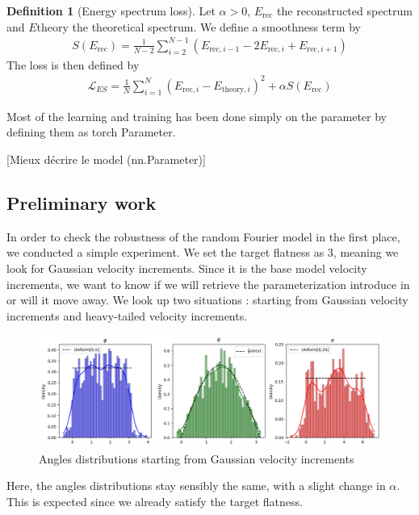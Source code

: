 \documentclass[a4paper,12pt]{article}
\theoremstyle{definition}
\newtheorem{definition}{Definition}
\begin{document}
\begin{definition}[Energy spectrum loss]
    Let $\alpha>0$, $E_\text{rec}$ the reconstructed spectrum and $E\text{theory}$ the theoretical spectrum.
    We define a smoothness term by 
    \begin{align}
        S(E_\text{rec}) = \frac{1}{N-2}\sum_{i=2}^{N-1}\left(E_{\text{rec},i-1} -2E_{\text{rec},i} + E_{\text{rec},i+1}   \right)
    \end{align}
    The loss is then defined by 
    \begin{align}
        \mathcal{L}_{ES} = \frac{1}{N} \sum_{i=1}^{N} (E_{\text{rec},i}-E_{\text{theory},i})^2 + \alpha S(E_\text{rec}) 
    \end{align} 
\end{definition}



\bigskip
Most of the learning and training has been done simply on the parameter by defining them as torch Parameter. 

[Mieux décrire le model (nn.Parameter)]

\subsection{Preliminary work}
In order to check the robustness of the random Fourier model in the first place, we conducted a simple experiment. We set the target flatness as 3, meaning we look for Gaussian velocity increments. Since it is the base model velocity increments, we want to know if we will retrieve the parameterization introduce in \cite{Janin2021} or will it move away. We look up two situations : starting from Gaussian velocity increments and heavy-tailed velocity increments.

\begin{figure}[H]
    \centering
    \includegraphics[width=1.0\linewidth]{illustrations/StartGaussian.png}
    \caption{Angles distributions starting from Gaussian velocity increments}
\end{figure}

Here, the angles distributions stay sensibly the same, with a slight change in $\alpha$. This is expected since we already satisfy the target flatness.
\end{document}

